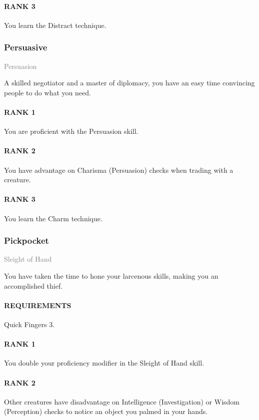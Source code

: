 \paragraph{RANK 3} You learn the Distract technique.

\subsubsection{Persuasive} \label{feat::persuasive}
\small{\textcolor{gray}{Persuasion}}

\normalsize
A skilled negotiator and a master of diplomacy, you have an easy time convincing people to do what you need.
\paragraph{RANK 1} You are proficient with the Persuasion skill.
\paragraph{RANK 2} You have advantage on Charisma (Persuasion) checks when trading with a creature.
\paragraph{RANK 3} You learn the Charm technique.

\subsubsection{Pickpocket} \label{feat::pickpocket}
\small{\textcolor{gray}{Sleight of Hand}}

\normalsize
You have taken the time to hone your larcenous skills, making you an accomplished thief.
\paragraph{REQUIREMENTS} Quick Fingers 3.
\paragraph{RANK 1} You double your proficiency modifier in the Sleight of Hand skill.
\paragraph{RANK 2} Other creatures have disadvantage on Intelligence (Investigation) or Wisdom (Perception) checks to notice an object you palmed in your hands.
